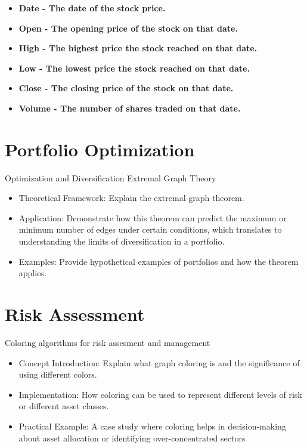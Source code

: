 \documentclass{article}
\begin{document}
\begin{itemize}
    \item \bf{Date} - The date of the stock price. 
    \item \bf{Open} - The opening price of the stock on that date.
    \item \bf{High} - The highest price the stock reached on that date.
    \item \bf{Low} - The lowest price the stock reached on that date.
    \item \bf{Close} - The closing price of the stock on that date.
    \item \bf{Volume} - The number of shares traded on that date.
\end{itemize}


\section{Portfolio Optimization}

Optimization and Diversification
Extremal Graph Theory

\begin{itemize}
    \item Theoretical Framework: Explain the extremal graph theorem.
    \item Application: Demonstrate how this theorem can predict the maximum or minimum number of edges under certain conditions, which translates to understanding the limits of diversification in a portfolio.
    \item Examples: Provide hypothetical examples of portfolios and how the theorem applies.
\end{itemize}


\section{Risk Assessment}
Coloring algorithms for risk assesment and management

\begin{itemize}
    \item Concept Introduction: Explain what graph coloring is and the significance of using different colors.
    \item Implementation: How coloring can be used to represent different levels of risk or different asset classes.
    \item Practical Example: A case study where coloring helps in decision-making about asset allocation or identifying over-concentrated sectors
\end{itemize}
\end{document}
